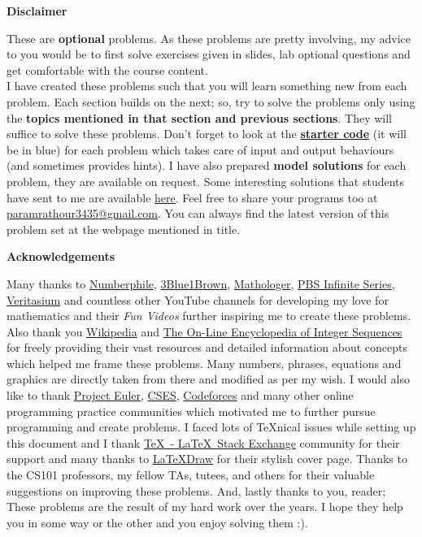 \begin{center}
	\textbf{\large{Disclaimer}}
\end{center}
These are \textbf{optional} problems.
As these problems are pretty involving, my advice to you would be to first solve exercises given in slides, lab optional questions and get comfortable with the course content.\\
I have created these problems such that you will learn something new from each problem. Each section builds on the next; so, try to solve the problems only using the \textbf{topics mentioned in that section and previous sections}. They will suffice to solve these problems. Don't forget to look at the \href{https://github.com/paramrathour/CS-101/tree/main/Starter%20Codes}{\textbf{starter code}} (it will be in blue) for each problem which takes care of input and output behaviours (and sometimes provides hints). I have also prepared \textbf{model solutions} for each problem, they are available on request. Some interesting solutions that students have sent to me are available \href{https://paramrathour.github.io/CS101/Solutions}{here}. Feel free to share your programs too at \href{mailto:paramrathour3435@gmail.com}{paramrathour3435@gmail.com}. You can always find the latest version of this problem set at the webpage mentioned in title.
\begin{center}
	\textbf{\large{Acknowledgements}}
\end{center}
Many thanks to \href{https://www.youtube.com/user/numberphile}{Numberphile}, \href{https://www.youtube.com/channel/UCYO_jab_esuFRV4b17AJtAw}{3Blue1Brown}, \href{https://www.youtube.com/channel/UC1_uAIS3r8Vu6JjXWvastJg}{Mathologer}, \href{https://www.youtube.com/channel/UCs4aHmggTfFrpkPcWSaBN9g}{PBS Infinite Series}, \href{https://www.youtube.com/user/1veritasium}{Veritasium} and countless other YouTube channels for developing my love for mathematics and their \emph{Fun Videos} further inspiring me to create these problems. Also thank you \href{https://en.wikipedia.org/wiki/Main_Page}{Wikipedia} and \href{http://oeis.org/}{The On-Line Encyclopedia of Integer Sequences} for freely providing their vast resources and detailed information about concepts which helped me frame these problems. Many numbers, phrases, equations and graphics are directly taken from there and modified as per my wish. I would also like to thank \href{https://projecteuler.net/}{Project Euler}, \href{https://cses.fi/problemset}{CSES}, \href{https://codeforces.com/}{Codeforces} and many other online programming practice communities which motivated me to further pursue programming and create problems. I faced lots of \TeX nical issues while setting up this document and I thank \href{tex.stackexchange.com}{\TeX\ - \LaTeX\ Stack Exchange} community for their support and many thanks to \href{https://latexdraw.com/tikz-cover-pages-gallery/}{\LaTeX Draw} for their stylish cover page. Thanks to the CS101 professors, my fellow TAs, tutees, and others for their valuable suggestions on improving these problems. And, lastly thanks to you, reader; These problems are the result of my hard work over the years. I hope they help you in some way or the other and you enjoy solving them :).
